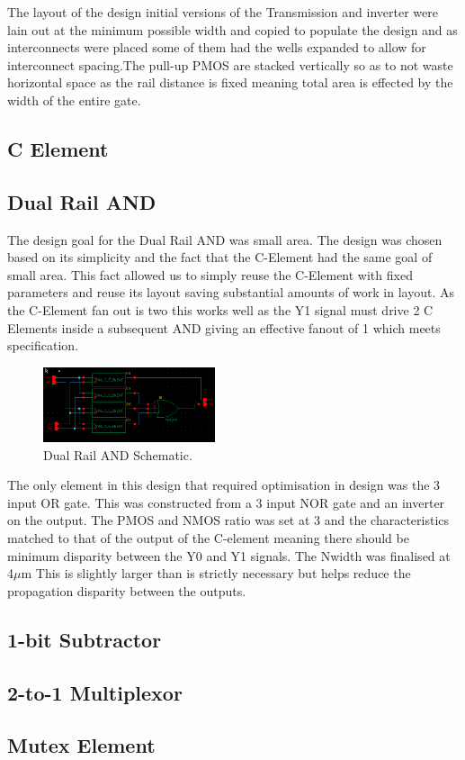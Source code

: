 The layout of the design initial versions of the Transmission and inverter were lain out  at the minimum possible width and copied to populate the design and as interconnects were placed some of them had the wells expanded to allow for interconnect spacing.The pull-up PMOS are stacked vertically so as to not waste horizontal space as the rail distance is fixed meaning total area is effected by the width of the entire gate.

\subsection{C Element}

\subsection{Dual Rail AND}
The design goal for the Dual Rail AND was small area. The design was chosen based on its simplicity and the fact that the C-Element had the same goal of small area. This fact allowed us to simply reuse the C-Element with fixed parameters and reuse its layout saving substantial amounts of work in layout. As the C-Element fan out is two this works well as the Y1 signal must drive 2 C Elements inside a subsequent AND giving an effective fanout of 1 which meets specification.

\begin{figure}[h]  
\centering
   \includegraphics[width=0.45\textwidth]{Figures/DualRailANDSchem.png}
\caption{Dual Rail AND Schematic.}
\label {fig:DualRailANDSchem}
\end{figure}

The only element in this design that required optimisation in design was the 3 input OR gate. This was constructed from a 3 input NOR gate and an inverter on the output. The PMOS and NMOS ratio was set at 3 and the characteristics matched to that of the output of the C-element meaning there should be minimum disparity between the Y0 and Y1 signals. The Nwidth was finalised at 4$\mu$m This is slightly larger than is strictly necessary but helps reduce the propagation disparity between the outputs.



\subsection{1-bit Subtractor}

\subsection{2-to-1 Multiplexor}

\subsection{Mutex Element}
